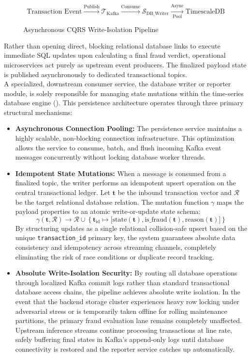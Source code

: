 \documentclass[12pt]{report}
\begin{document}
\begin{figure}[H]
    \centering
    $$
        \text{Transaction Event} \xrightarrow{\text{Publish}} \mathcal{T}_{\text{Kafka}} \xrightarrow{\text{Consume}} \mathcal{S}_{\text{DB\_Writer}} \xrightarrow[\text{Pool}]{\text{Async}} \text{TimescaleDB}
    $$
    \caption{Asynchronous CQRS Write-Isolation Pipeline}
\end{figure}
Rather than opening direct, blocking relational database links to execute immediate SQL updates upon calculating a final fraud verdict, operational microservices act purely as upstream event producers. The finalized payload state is published asynchronously to dedicated transactional topics.
\\
A specialized, downstream consumer service, the database writer or reporter module, is solely responsible for managing state mutations within the time-series database engine (). This persistence architecture operates through three primary structural mechanisms:
\begin{itemize}
    \item \textbf{Asynchronous Connection Pooling:} The persistence service maintains a highly scalable, non-blocking connection infrastructure. This optimization allows the service to consume, batch, and flush incoming Kafka event messages concurrently without locking database worker threads.
    \item \textbf{Idempotent State Mutations:} When a message is consumed from a finalized topic, the writer performs an idempotent upsert operation on the central transactional ledger. Let $\mathbf{t}$ be the inbound transaction vector and $\mathcal{R}$ be the target relational database relation. The mutation function $\gamma$ maps the payload properties to an atomic write-or-update state schema:
    $$
        \gamma(\mathbf{t}, \mathcal{R}) \rightarrow \mathcal{R} \cup \left\{ \mathbf{t}_{\text{id}} \mapsto \big[\text{state}(\mathbf{t}), \text{is\_fraud}(\mathbf{t}), \text{reason}(\mathbf{t})\big] \right\}
    $$
    By structuring updates as a single relational collision-safe upsert based on the unique \texttt{transaction\_id} primary key, the system guarantees absolute data consistency and idempotency across streaming channels, completely eliminating the risk of race conditions or duplicate record tracking.
    \item \textbf{Absolute Write-Isolation Security:} By routing all database operations through localized Kafka commit logs rather than standard transactional database access chains, the pipeline achieves absolute write isolation. In the event that the backend storage cluster experiences heavy row locking under adversarial stress or is temporarily taken offline for rolling maintenance partitions, the primary fraud evaluation lane remains completely unaffected. Upstream inference streams continue processing transactions at line rate, safely buffering final states in Kafka's append-only logs until database connectivity is restored and the reporter service catches up automatically.
\end{itemize}
\end{document}
